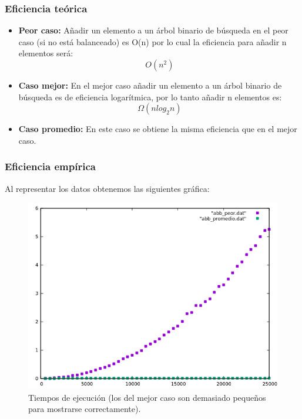 \subsubsection{Eficiencia teórica}

\begin{itemize}
  \item \textbf{Peor caso:} Añadir un elemento a un árbol binario de búsqueda en el peor caso (si no está balanceado) es O(n) por lo cual la eficiencia para añadir n elementos será:
  \begin{equation} O(n^2) \end{equation}
  
  \item \textbf{Caso mejor:} En el mejor caso añadir un elemento a un árbol binario de búsqueda es de eficiencia logarítmica, por lo tanto añadir n elementos es: 
  \begin{equation} \Omega(n log_2n) \end{equation} 
  \item \textbf{Caso promedio:} En este caso se obtiene la misma eficiencia que en el mejor caso.
\end{itemize}

\subsubsection{Eficiencia empírica}

Al representar los datos obtenemos las siguientes gráfica:

\begin{figure}[H]
    \begin{center}
        \includegraphics[scale=0.7]{imagenes/g_abb.png}
        \caption{Tiempos de ejecución (los del mejor caso son demasiado pequeños para mostrarse correctamente).}
        \label{fig19}
    \end{center}
\end{figure}

